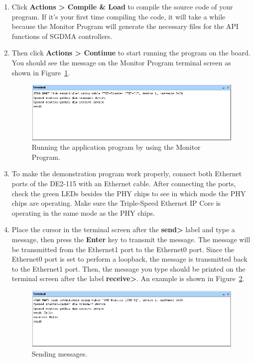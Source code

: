 \documentclass[11pt, twoside, pdftex]{article}
\begin{document}
\begin{enumerate}
	\item Click {\bf Actions > Compile \& Load} to compile the source code of your program. If it's your first time compiling the code, it will take a while because the Monitor Program will generate the necessary files for the API functions of SGDMA controllers. 
	
	\item Then click {\bf Actions > Continue} to start running the program on the board. You should see the message on the Monitor Program terminal screen as shown in Figure~\ref{fig:monitor_figure4}.
	
	\begin{figure}[H]
		\centering
		  \includegraphics[scale=0.75]{figures/monitor_figure4.png}
		\caption{Running the application program by using the Monitor Program.} 
		\label{fig:monitor_figure4}
	\end{figure}	
	
	\item To make the demonstration program work properly, connect both Ethernet ports of the DE2-115 with an Ethernet cable. After connecting the ports, check the green LEDs besides the PHY chips to see in which mode the PHY chips are operating. Make sure the Triple-Speed Ethernet IP Core is operating in the same mode as the PHY chips. 
	
	\item Place the cursor in the terminal screen after the {\bf send>} label and type a message, then press the {\bf Enter} key to transmit the message. The message will be transmitted from the Ethernet1 port to the Ethernet0 port. Since the Ethernet0 port is set to perform a loopback, the message is transmitted back to the Ethernet1 port. Then, the message you type should be printed on the terminal screen after the label {\bf receive>}. An example is shown in Figure~\ref{fig:monitor_figure5}.

	\begin{figure}[H]
		\centering
		  \includegraphics[scale=0.75]{figures/monitor_figure5.png}
		\caption{Sending messages.} 
		\label{fig:monitor_figure5}
	\end{figure}

\end{enumerate}
\end{document}
